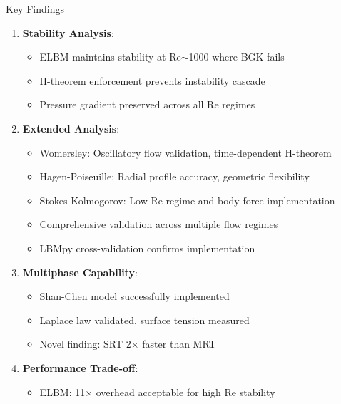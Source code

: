 \documentclass[aspectratio=169]{beamer}
\begin{document}
\begin{frame}{Key Findings}
\begin{enumerate}
    \item \textbf{Stability Analysis}:
    \begin{itemize}
        \item ELBM maintains stability at Re$\sim$1000 where BGK fails
        \item H-theorem enforcement prevents instability cascade
        \item Pressure gradient preserved across all Re regimes
    \end{itemize}

    \item \textbf{Extended Analysis}:
    \begin{itemize}
        \item Womersley: Oscillatory flow validation, time-dependent H-theorem
        \item Hagen-Poiseuille: Radial profile accuracy, geometric flexibility
        \item Stokes-Kolmogorov: Low Re regime and body force implementation
        \item Comprehensive validation across multiple flow regimes
        \item LBMpy cross-validation confirms implementation
    \end{itemize}

    \item \textbf{Multiphase Capability}:
    \begin{itemize}
        \item Shan-Chen model successfully implemented
        \item Laplace law validated, surface tension measured
        \item Novel finding: SRT 2$\times$ faster than MRT
    \end{itemize}

    \item \textbf{Performance Trade-off}:
    \begin{itemize}
        \item ELBM: 11$\times$ overhead acceptable for high Re stability
    \end{itemize}
\end{enumerate}
\end{frame}
\end{document}
